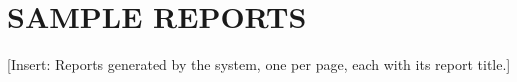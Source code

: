 \chapter{SAMPLE REPORTS}
[Insert: Reports generated by the system, one per page, each with its report title.]
